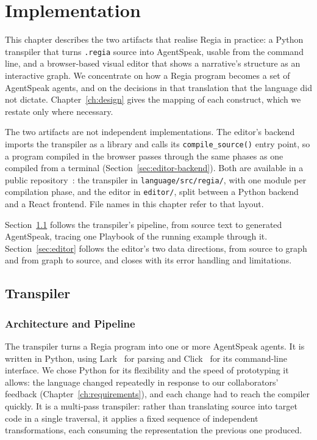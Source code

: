 \chapter{Implementation}
\label{ch:implementation}
 
This chapter describes the two artifacts that realise Regia in practice: a Python transpiler that turns \lstinline|.regia| source into AgentSpeak, usable from the command line, and a browser-based visual editor that shows a narrative's structure as an interactive graph. We concentrate on how a Regia program becomes a set of AgentSpeak agents, and on the decisions in that translation that the language did not dictate. Chapter~\ref{ch:design} gives the mapping of each construct, which we restate only where necessary.
 
The two artifacts are not independent implementations. The editor's backend imports the transpiler as a library and calls its \lstinline|compile_source()| entry point, so a program compiled in the browser passes through the same phases as one compiled from a terminal (Section~\ref{sec:editor-backend}). Both are available in a public repository~\cite{RegiaRepo}: the transpiler in \lstinline|language/src/regia/|, with one module per compilation phase, and the editor in \lstinline|editor/|, split between a Python backend and a React frontend. File names in this chapter refer to that layout.
 
Section~\ref{sec:transpiler} follows the transpiler's pipeline, from source text to generated AgentSpeak, tracing one Playbook of the running example through it. Section~\ref{sec:editor} follows the editor's two data directions, from source to graph and from graph to source, and closes with its error handling and limitations.
 
 
\section{Transpiler}
\label{sec:transpiler}
 
\subsection{Architecture and Pipeline}
\label{sec:pipeline-overview}
 
The transpiler turns a Regia program into one or more AgentSpeak agents. It is written in Python, using Lark~\cite{Lark} for parsing and Click~\cite{Click} for its command-line interface. We chose Python for its flexibility and the speed of prototyping it allows: the language changed repeatedly in response to our collaborators' feedback (Chapter~\ref{ch:requirements}), and each change had to reach the compiler quickly. It is a multi-pass transpiler: rather than translating source into target code in a single traversal, it applies a fixed sequence of independent transformations, each consuming the representation the previous one produced.
 
